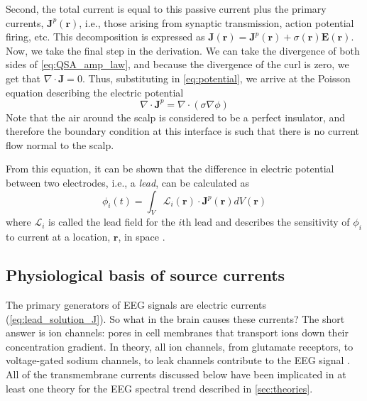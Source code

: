 Second, the total current is equal to this passive current plus the primary currents, $\bm{J}^p(\bm{r})$, i.e., those arising from synaptic transmission, action potential firing, etc. This decomposition is expressed as $\bm{J}(\bm{r}) = \bm{J}^p(\bm{r}) + \sigma(\bm{r}) \bm{E}(\bm{r})$. Now, we take the final step in the derivation. We can take the divergence of both sides of \ref{eq:QSA_amp_law}, and because the divergence of the curl is zero, we get that $\nabla \cdot \bm{J} = 0$. Thus, substituting in \ref{eq:potential}, we arrive at the Poisson equation describing the electric potential
\begin{equation} \label{eq:poisson}
    \nabla \cdot \bm{J}^p = \nabla \cdot \left(\sigma \nabla \phi \right)
\end{equation}
Note that the air around the scalp is considered to be a perfect insulator, and therefore the boundary condition at this interface is such that there is no current flow normal to the scalp. 

From this equation, it can be shown that the difference in electric potential between two electrodes, i.e., a \textit{lead}, can be calculated as \cite{RevModPhys.65.413}
\begin{equation} \label{eq:lead_solution_J}
    \phi_i(t) = \int_V \mathcal{L}_i(\bm{r}) \cdot \bm{J}^p(\bm{r}) dV(\bm{r})
\end{equation}
where $\mathcal{L}_i$ is called the lead field for the $i$th lead  and describes the sensitivity of $\phi_i$ to current at a location, $\bm{r}$, in space \cite{Malmivuo1995}. 

\subsection{Physiological basis of source currents}
The primary generators of EEG signals are electric currents (\ref{eq:lead_solution_J}). So what in the brain causes these currents? The short answer is ion channels: pores in cell membranes that transport ions down their concentration gradient. In theory, all ion channels, from glutamate receptors, to voltage-gated sodium channels, to leak channels contribute to the EEG signal \cite{Buzsaki2012}. All of the transmembrane currents discussed below have been implicated in at least one theory for the EEG spectral trend described in \autoref{sec:theories}.

